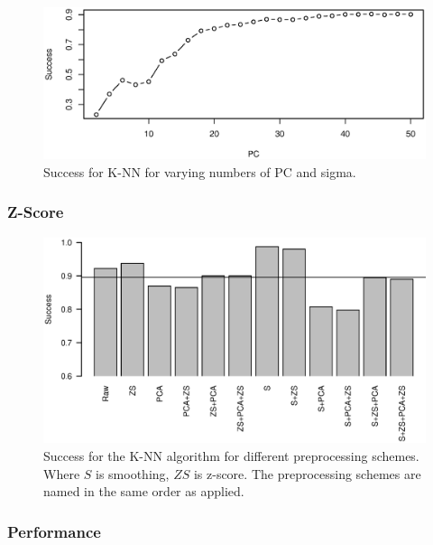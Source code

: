 \begin{figure}[H]
\centering
\includegraphics[width = 1 \textwidth]{graphics/knn_pc}
\caption{Success for K-NN for varying numbers of PC and sigma.}
\end{figure}


\subsubsection{Z-Score}

\begin{figure}[H]
\includegraphics[width = 1 \textwidth]{graphics/knn_zscore}
\caption{Success for the K-NN algorithm for different preprocessing schemes.
Where $S$ is smoothing, $ZS$ is z-score.
The preprocessing schemes are named in the same order as applied.}
\end{figure}


\subsubsection{Performance}

\begin{figure}[H]
\centering
{}
\end{figure}

